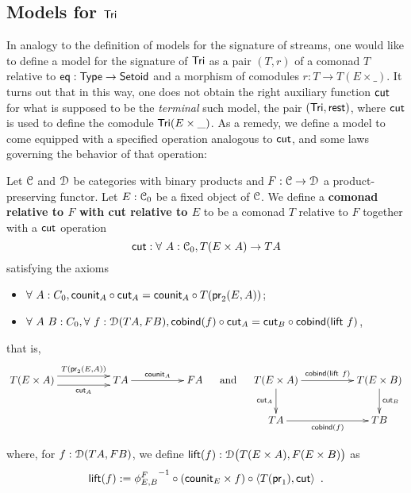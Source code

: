 \documentclass[a4paper,USenglish]{lipics}
\newcommand{\fat}[1]{\textbf{#1}}
\begin{document}
\begin{Long}
\subsection{Models for $\Tri$}
\end{Long}

In analogy to the definition of models for the signature of streams, one would like to define
a model for the signature of $\Tri$ as a pair $(T,r)$ of a comonad $T$ relative to $\eq : \Set \to \Setoid$ and 
a morphism of comodules $r : T \to T(E\times \_)$. 
It turns out that in this way, one does not obtain the right auxiliary function $\cut$ for what is
supposed to be the \emph{terminal} such model, the pair $(\Tri,\tail)$, where $\cut$ is used to define the comodule $\Tri(E\times \_)$.
As a remedy, we define a model to come equipped with a specified operation analogous to $\cut$, and some laws governing
the behavior of that operation:




\begin{defn}%
\label{def:rel_comonad_with_cut}
 Let $\C$ and $\D$ be categories with binary products and $F:\C\to\D$ a product-preserving functor. Let $E:\C_0$ be a fixed object of $\C$.
 We define a \fat{comonad relative to $F$ with cut relative to $E$} to be a comonad $T$ relative to $F$ together with a $\cut$ operation 
    \[ \cut : \forall~A:\C_0, T(E\times A) \to TA \]
%   
 satisfying the axioms
  \begin{itemize}
   \item $\forall~A:C_0, \comp{\cut_A}{\counit_A} = \comp{T(\pr_2(E,A))}{\counit_{A}}$;
   \item $\forall~A~B:C_0,\forall~f:\D(TA,FB), \comp{\cut_A}{\cobind(f)} = \comp{\cobind(\extend~f)}{\cut_B}$,
  \end{itemize}
that is,
\[
 \begin{xy}
  \xymatrix@C=5em{
                T(E\times A) \ar@<1ex>[r]^-{T(\pr_2(E,A))} \ar@<-1ex>[r]_-{\cut_A} & TA \ar[r]^{\counit_A} & FA
  }
 \end{xy}
 \quad\text{ and } \quad
 \begin{xy}
  \xymatrix@C=5em{
	      T(E\times A) \ar[r]^{\cobind(\extend~f)} \ar[d]_{\cut_A} & T(E\times B) \ar[d]^{\cut_B} \\
	      TA \ar[r]_{\cobind(f)} &  TB 
  }
 \end{xy}
\]


  \noindent
  where, for $f:\D(TA,FB)$, we define $\extend(f) : \D\bigl(T(E\times A),F(E\times B)\bigr)$ as
       \[ \extend(f) := \comp{\comp{\langle T(\pr_1) , \cut \rangle}{(\counit_E\times f)}}{{\phi^{F}_{E,B}}^{-1}} \enspace . \]
  
\end{defn}
\end{document}
